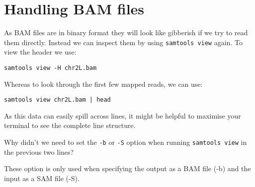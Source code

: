 \section{Handling BAM files}
\begin{steps}
As BAM files are in binary format they will look like gibberish if we try to read them directly.
Instead we can inspect them by using \texttt{samtools view} again.
To view the header we use:\\
\begin{lstlisting}
samtools view -H chr2L.bam
\end{lstlisting}
Whereas to look through the first few mapped reads, we can use:
\begin{lstlisting}
samtools view chr2L.bam | head
\end{lstlisting}
As this data can easily spill across lines, it might be helpful to maximise your terminal to see the complete line structure.
\end{steps}

\begin{questions}
Why didn't we need to set the \texttt{-b} or \texttt{-S} option when running \texttt{samtools view} in the previous two lines?\\
\begin{answer}
These option is only used when specifying the output as a BAM file (-b) and the input as a SAM file (-S).\\
\end{answer}
\end{questions}

